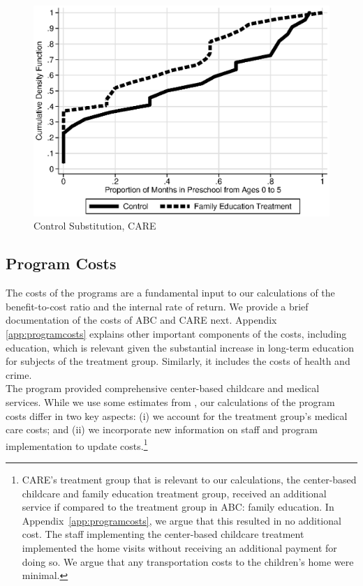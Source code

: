 \begin{figure}[H]
		\caption{Control Substitution, CARE} \label{fig:treatsubcare}
		\includegraphics[width=.9\columnwidth]{output/care_controlcontamination_months.eps}
\end{figure}

\subsection{Program Costs}

\noindent The costs of the programs are a fundamental input to our calculations of the benefit-to-cost ratio and the internal rate of return. We provide a brief documentation of the costs of ABC and CARE next. Appendix \ref{app:programcosts} explains other important components of the costs, including education, which is relevant given the substantial increase in long-term education for subjects of the treatment group. Similarly, it includes the costs of health and crime.\\

\noindent The program provided comprehensive center-based childcare and medical services. While we use some estimates from \cite{Masse_Barnett_2002_BOOKBenefitCostAnalysis}, our calculations of the program costs differ in two key aspects: (i) we account for the treatment group's medical care costs; and (ii) we incorporate new information on staff and program implementation to update costs.\footnote{CARE's treatment group that is relevant to our calculations, the center-based childcare and family education treatment group, received an additional service if compared to the treatment group in ABC: family education. In Appendix~\ref{app:programcosts}, we argue that this resulted in no additional cost. The staff implementing the center-based childcare treatment implemented the home visits without receiving an additional payment for doing so. We argue that any transportation costs to the children's home were minimal.}


